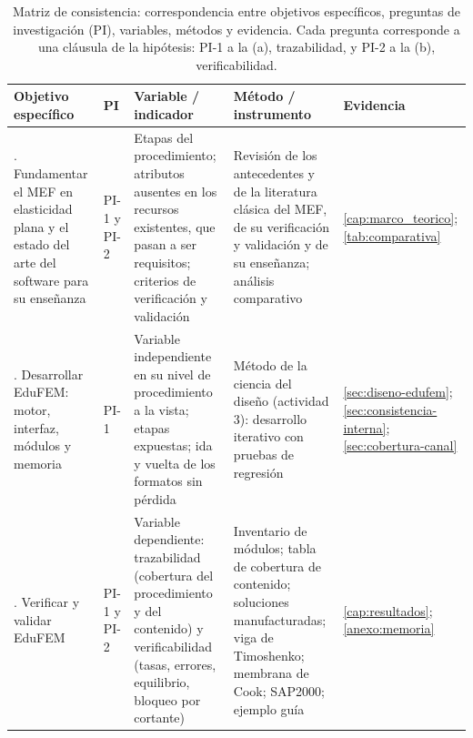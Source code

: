 \begin{table}[htbp]
\centering
\caption[Matriz de consistencia de la investigación.]{Matriz de consistencia: correspondencia entre objetivos específicos, preguntas de investigación (PI), variables, métodos y evidencia. Cada pregunta corresponde a una cláusula de la hipótesis: PI-1 a la (a), trazabilidad, y PI-2 a la (b), verificabilidad.}
\label{tab:consistencia}
{\footnotesize
\setlength{\tabcolsep}{3pt}
\renewcommand{\arraystretch}{1.15}
\begin{tabular}{@{}>{\raggedright\arraybackslash}p{3.0cm}>{\raggedright\arraybackslash}p{1.3cm}>{\raggedright\arraybackslash}p{3.0cm}>{\raggedright\arraybackslash}p{3.6cm}>{\raggedright\arraybackslash}p{2.7cm}@{}}
\toprule
\textbf{Objetivo específico} & \textbf{PI} & \textbf{Variable / indicador} & \textbf{Método / instrumento} & \textbf{Evidencia} \\
\midrule
1. Fundamentar el MEF en elasticidad plana y el estado del arte del software para su enseñanza & PI-1 y PI-2 & Etapas del procedimiento; atributos ausentes en los recursos existentes, que pasan a ser requisitos; criterios de verificación y validación & Revisión de los antecedentes y de la literatura clásica del MEF, de su verificación y validación y de su enseñanza; análisis comparativo & \autoref{cap:marco_teorico}; \autoref{tab:comparativa} \\
2. Desarrollar EduFEM: motor, interfaz, módulos y memoria & PI-1 & Variable independiente en su nivel de procedimiento a la vista; etapas expuestas; ida y vuelta de los formatos sin pérdida & Método de la ciencia del diseño (actividad 3): desarrollo iterativo con pruebas de regresión & \autoref{sec:diseno-edufem}; \autoref{sec:consistencia-interna}; \autoref{sec:cobertura-canal} \\
3. Verificar y validar EduFEM & PI-1 y PI-2 & Variable dependiente: trazabilidad (cobertura del procedimiento y del contenido) y verificabilidad (tasas, errores, equilibrio, bloqueo por cortante) & Inventario de módulos; tabla de cobertura de contenido; soluciones manufacturadas; viga de Timoshenko; membrana de Cook; SAP2000; ejemplo guía & \autoref{cap:resultados}; \autoref{anexo:memoria} \\
\bottomrule
\end{tabular}}
\end{table}

